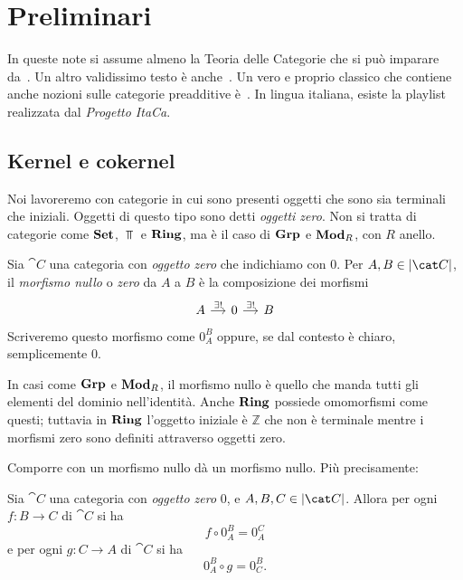 
\chapter{Preliminari}

In queste note si assume almeno la {\sc Teoria delle Categorie} che si
può imparare da~\cite{leinster:categories}. Un altro validissimo testo è
anche~\cite{riehl:categories}. Un vero e proprio classico che contiene
anche nozioni sulle categorie preadditive
è~\cite{maclane:categories}. In lingua italiana,
esiste la playlist~\cite{itaca:categorie} realizzata dal {\em Progetto ItaCa}.



\section{Kernel e cokernel}

Noi lavoreremo con categorie in cui sono presenti oggetti che sono sia
terminali che iniziali. Oggetti di questo tipo sono detti {\em oggetti
  zero}. Non si tratta di categorie come \(\mathbf{Set}\), \(\Top\) e \(\mathbf{Ring}\),
ma è il caso di \(\mathbf{Grp}\) e \(\mathbf{Mod}_R\), con \(R\) anello.

\begin{definition}
  Sia \(\cat C\) una categoria con {\em oggetto zero} che indichiamo con
  \(0\). Per \(A, B \in \obj{\cat C}\), il {\em morfismo nullo} o {\em
    zero} da \(A\) a \(B\) è la composizione dei morfismi
  \[
    \begin{tikzcd}[column sep=small]
      A \ar["{\exists!}", r] & 0 \ar["{\exists!}", r] & B
    \end{tikzcd}
  \]
  Scriveremo questo morfismo come \(0_A^B\) oppure, se dal contesto è
  chiaro, semplicemente \(0\).
\end{definition}

\begin{example}
  In casi come \(\mathbf{Grp}\) e \(\mathbf{Mod}_R\), il morfismo nullo è quello che
  manda tutti gli elementi del dominio nell'identità. Anche \(\mathbf{Ring}\)
  possiede omomorfismi come questi; tuttavia in \(\mathbf{Ring}\) l'oggetto
  iniziale è \(\mathbb{Z}\) che non è terminale mentre i morfismi zero sono
  definiti attraverso oggetti zero.
\end{example}

Comporre con un morfismo nullo dà un morfismo nullo. Più precisamente:

\begin{proposition}\label{lemma:CompCon0}
  Sia \(\cat C\) una categoria con {\em oggetto zero} \(0\), e
  \(A, B, C \in \obj{\cat C}\). Allora per ogni \(f : B \to C\) di
  \(\cat C\) si ha
  \[
    f \circ 0_A^B = 0_A^C
  \]
  e per ogni \(g : C \to A\) di \(\cat C\) si ha
  \[
    0_A^B \circ g = 0_C^B .
  \]
\end{proposition}


